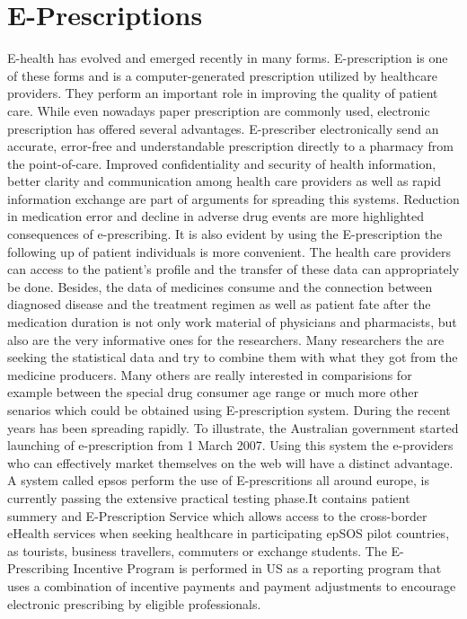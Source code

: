 \documentclass[10pt, conference, compsocconf]{IEEEtran}
\begin{document}
\section{E-Prescriptions}
E-health has evolved and emerged recently in many forms. 
E-prescription is one of these forms and is a computer-generated prescription utilized by healthcare providers.
They perform an important role in improving the quality of patient care.
While even nowadays paper prescription are commonly used, electronic prescription has offered several advantages.
E-prescriber electronically send an accurate, error-free and understandable prescription directly to a pharmacy from the point-of-care.
Improved confidentiality and security of health information, better clarity and communication among health care providers as well as rapid information exchange are part of arguments for spreading this systems.
Reduction in medication error and decline in adverse drug events are more highlighted consequences of e-prescribing.
It is also evident by using the E-prescription the following up of patient individuals is more convenient.
The health care providers can access to the patient's profile and the transfer of these data can appropriately be done.
Besides, the data of medicines consume and the connection between diagnosed disease and the treatment regimen as well as patient fate after the medication duration is not only work material of  physicians and pharmacists, but also are the very informative ones for the researchers.
Many researchers  the are seeking the statistical data and try to combine them with what they got from the medicine producers. Many others are really interested in comparisions for example between the special drug consumer age range or much more other senarios which could be obtained using E-prescription system.
During the recent years has been spreading rapidly. To illustrate, the Australian government started launching of e-prescription from 1 March 2007.
Using this system the e-providers who can effectively market themselves on the web will have a distinct advantage.
A system called epsos perform the use of E-prescritions all around europe, is currently passing the extensive practical testing phase.It contains patient summery and E-Prescription Service which allows access to the cross-border eHealth services when seeking healthcare in participating epSOS pilot countries, as tourists, business travellers, commuters or exchange students.
The E-Prescribing Incentive Program is performed in US as a reporting program that uses a combination of incentive payments and payment adjustments to encourage electronic prescribing by eligible professionals.
\end{document}
